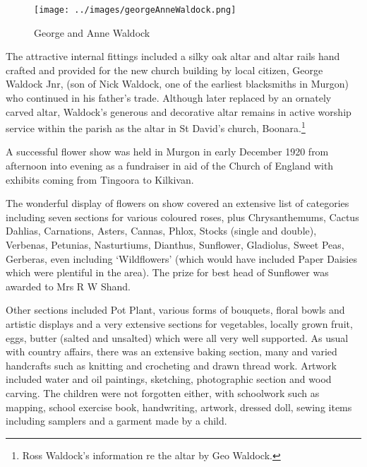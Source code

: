 \begin{figure}
\begin{center}
\texttt{[image: ../images/georgeAnneWaldock.png]}
\caption{George and Anne Waldock}
\end{center}
\end{figure}




The attractive internal fittings included a silky oak altar and altar rails hand crafted and provided for the new church building by local citizen, George Waldock Jnr, (son of Nick Waldock, one of the earliest blacksmiths in Murgon) who continued in his father's trade. Although later replaced by an ornately carved altar, Waldock's generous and decorative altar remains in active worship service within the parish as the altar in St David's church, Boonara.\footnote{Ross Waldock's information re the altar by Geo Waldock.}


A successful flower show was held in Murgon in early December 1920 from afternoon into evening as a fundraiser in aid of the Church of England with exhibits coming from Tingoora to Kilkivan.



The wonderful display of flowers on show covered an extensive list of categories including seven sections for various coloured roses, plus Chrysanthemums, Cactus Dahlias, Carnations, Asters, Cannas, Phlox, Stocks (single and double), Verbenas, Petunias, Nasturtiums, Dianthus, Sunflower, Gladiolus, Sweet Peas, Gerberas, even including `Wildflowers' (which would have included Paper Daisies which were plentiful in the area). The prize for best head of Sunflower was awarded to Mrs R W Shand.



Other sections included Pot Plant, various forms of bouquets, floral bowls and artistic displays and a very extensive sections for vegetables, locally grown fruit, eggs, butter (salted and unsalted) which were all very well supported. As usual with country affairs, there was an extensive baking section, many and varied handcrafts such as knitting and crocheting and drawn thread work. Artwork included water and oil paintings, sketching, photographic section and wood carving. The children were not forgotten either, with schoolwork such as mapping, school exercise book, handwriting, artwork, dressed doll, sewing items including samplers and a garment made by a child.



